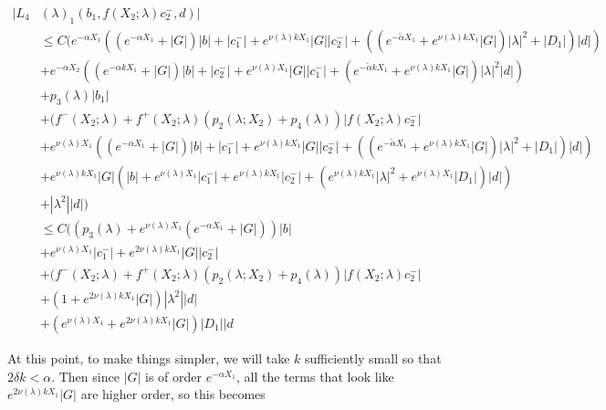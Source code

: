 \documentclass[12pt]{article}
\begin{document}
\begin{enumerate}
\begin{align*}
|L_4&(\lambda)_1(b_1, f(X_2; \lambda) c_2^-, d)|\\ 
&\leq C( e^{-\alpha X_1}((e^{-\alpha X_1} + |G|) |b| + |c_1^-| + e^{\nu(\lambda)k X_1} |G||c_2^-| + ((e^{-\tilde{\alpha} X_1} + e^{\nu(\lambda)k X_1} |G|) |\lambda|^2 + |D_1| )|d| ) \\
&+ e^{-\alpha X_2} ((e^{-\alpha k X_1} + |G|) |b| + |c_2^-| + e^{\nu(\lambda) X_1} |G||c_1^-| + (e^{-\tilde{\alpha} k X_1} + e^{\nu(\lambda)k X_1} |G|) |\lambda|^2 |d| ) \\
&+ p_3(\lambda) |b_1| \\
&+ (f^-(X_2; \lambda) + f^+(X_2; \lambda) (p_2(\lambda; X_2) + p_4(\lambda)) | f(X_2; \lambda) c_2^-| \\
&+ e^{\nu(\lambda)X_1} ((e^{-\alpha X_1} + |G|) |b| + |c_1^-| + e^{\nu(\lambda)k X_1} |G||c_2^-| + ((e^{-\tilde{\alpha} X_1} + e^{\nu(\lambda)k X_1} |G|) |\lambda|^2 + |D_1| )|d| ) \\
&+ e^{\nu(\lambda)k X_1}|G| ( |b| + e^{\nu(\lambda) X_1} |c_1^-| +  e^{\nu(\lambda) k X_1} |c_2^-| + (e^{\nu(\lambda)k X_1}|\lambda|^2 + e^{\nu(\lambda) X_1} |D_1|) |d| )\\
&+ |\lambda^2||d|) \\
&\leq C( ( p_3(\lambda) + e^{\nu(\lambda)X_1} (e^{-\alpha X_1} + |G|)) |b| \\
&+ e^{\nu(\lambda)X_1} |c_1^-| + e^{2 \nu(\lambda)k X_1}|G| |c_2^-| \\
&+ (f^-(X_2; \lambda) + f^+(X_2; \lambda) (p_2(\lambda; X_2) + p_4(\lambda)) | f(X_2; \lambda) c_2^-| \\
&+ (1 + e^{2 \nu(\lambda)k X_1}|G|)|\lambda^2||d| \\
&+ (e^{\nu(\lambda)X_1} + e^{2 \nu(\lambda)k X_1}|G| )|D_1||d
\end{align*}

At this point, to make things simpler, we will take $k$ sufficiently small so that $2 \delta k < \alpha$. Then since $|G|$ is of order $e^{-\alpha X_1}$, all the terms that look like $e^{2 \nu(\lambda)k X_1}|G|$ are higher order, so this becomes


\end{enumerate}
\end{document}
